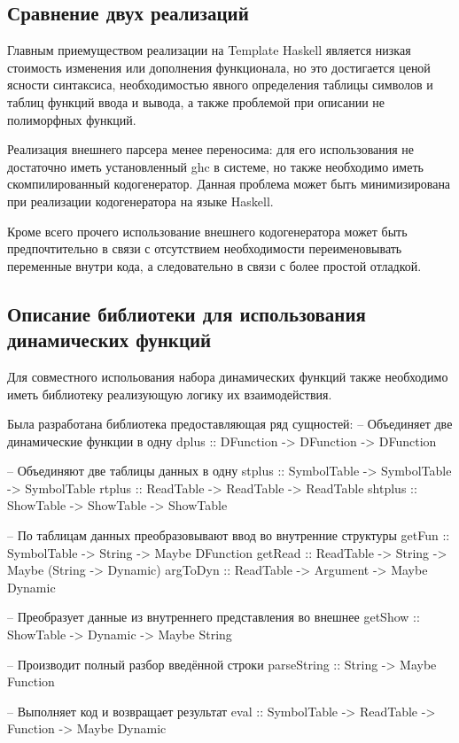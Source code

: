 \documentclass[a4paper,12pt]{article}
\newenvironment{code}{\footnotesize\verbatim}{\endverbatim\normalsize}
\begin{document}
\subsection{Сравнение двух реализаций}

Главным приемуществом реализации на Template Haskell является низкая
стоимость изменения или дополнения функционала, но это достигается
ценой ясности синтаксиса, необходимостью явного определения таблицы
символов и таблиц функций ввода и вывода, а также проблемой при
описании не полиморфных функций.

Реализация внешнего парсера менее переносима: для его использования не
достаточно иметь установленный ghc в системе, но также необходимо
иметь скомпилированный кодогенератор. Данная проблема может быть
минимизирована при реализации кодогенератора на языке Haskell. 

Кроме всего прочего использование внешнего кодогенератора может быть
предпочтительно в связи с отсутствием необходимости переименовывать
переменные внутри кода, а следовательно в связи с более простой
отладкой.

\subsection{Описание библиотеки для использования динамических функций}

Для совместного испольования набора динамических функций также
необходимо иметь библиотеку реализующую логику их взаимодействия.

Была разработана библиотека предоставляющая ряд сущностей:
\begin{code}
-- Объединяет две динамические функции в одну
dplus :: DFunction -> DFunction -> DFunction

-- Объединяют две таблицы данных в одну
stplus :: SymbolTable -> SymbolTable -> SymbolTable
rtplus :: ReadTable -> ReadTable -> ReadTable
shtplus :: ShowTable -> ShowTable -> ShowTable

-- По таблицам данных преобразовывают ввод во внутренние структуры
getFun :: SymbolTable -> String -> Maybe DFunction
getRead :: ReadTable -> String -> Maybe (String -> Dynamic)
argToDyn :: ReadTable -> Argument -> Maybe Dynamic

-- Преобразует данные из внутреннего представления во внешнее
getShow :: ShowTable -> Dynamic -> Maybe String

-- Производит полный разбор введённой строки
parseString :: String -> Maybe Function

-- Выполняет код и возвращает результат
eval :: SymbolTable -> ReadTable -> Function -> Maybe Dynamic
\end{code}
\end{document}
